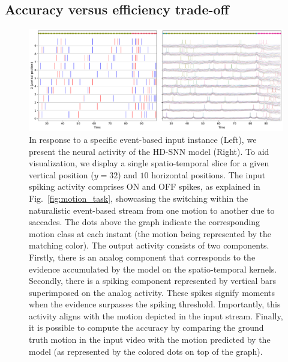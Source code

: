 \documentclass[default]{sn-jnl}%
\theoremstyle{thmstyleone}%
\theoremstyle{thmstyletwo}%
\theoremstyle{thmstylethree}%
\begin{document}
\subsection{Accuracy versus efficiency trade-off}%
%
\begin{figure}%
    \centering
    \includegraphics[width=0.95\linewidth]{figures/conv_HD-SNN.pdf}
    \caption{
        In response to a specific event-based input instance (Left), we present the neural activity of the HD-SNN model (Right). To aid visualization, we display a single spatio-temporal slice for a given vertical position ($y = 32$) and $10$ horizontal positions. The input spiking activity comprises ON and OFF spikes, as explained in Fig.~\ref{fig:motion_task}, showcasing the switching within the naturalistic event-based stream from one motion to another due to saccades. The dots above the graph indicate the corresponding motion class at each instant (the motion being represented by the matching color). The output activity consists of two components. Firstly, there is an analog component that corresponds to the evidence accumulated by the model on the spatio-temporal kernels. Secondly, there is a spiking component represented by vertical bars superimposed on the analog activity. These spikes signify moments when the evidence surpasses the spiking threshold. Importantly, this activity aligns with the motion depicted in the input stream. Finally, it is possible to compute the accuracy by comparing the ground truth motion in the input video with the motion predicted by the model (as represented by the colored dots on top of the graph).
        }
    \label{fig:activity}
\end{figure}
%
\end{document}

